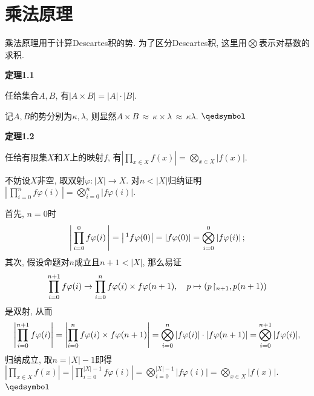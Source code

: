 \documentclass[UTF8]{ctexart}
\begin{document}
\setlength{\abovedisplayskip}{1pt}
\setlength{\belowdisplayskip}{1pt}

\section{乘法原理}

乘法原理用于计算Descartes积的势. 为了区分Descartes积,
这里用$\displaystyle\bigotimes$表示对基数的求积.

\vspace{10pt}

\hypertarget{sec:定理1.1}{}
\noindent\textbf{定理1.1}

任给集合$A,B$, 有$|A\times B|=|A|\cdot|B|$.


记$A,B$的势分别为$\kappa,\lambda$, 则显然$A\times B\,\approx\,
\kappa\times\lambda\,\approx\,\kappa\lambda$. \hfill $\qedsymbol$

\vspace{10pt}

\hypertarget{sec:定理1.2}{}
\noindent\textbf{定理1.2}

任给有限集$X$和$X$上的映射$f$, 有$\displaystyle
\left|\prod_{x\in X}f(x)\right|=\bigotimes_{x\in X}|f(x)|$.


不妨设$X$非空, 取双射$\varphi:|X|\to X$. 对$n<|X|$归纳证明$\displaystyle
\left|\,\prod_{i=0}^nf\varphi(i)\,\right|=\bigotimes_{i=0}^n|f\varphi(i)|$.

首先, $n=0$时
\[
    \left|\,\prod_{i=0}^0f\varphi(i)\,\right|=\left|\,^1f\varphi(0)\right|=
    |f\varphi(0)|=\bigotimes_{i=0}^0|f\varphi(i)|\,;\\[3pt]
\]
其次, 假设命题对$n$成立且$n+1<|X|$, 那么易证
\vspace{3pt}
\[
    \prod_{i=0}^{n+1}f\varphi(i)\to\prod_{i=0}^nf\varphi(i)\times f\varphi(n+1),
    \quad p\mapsto(p\!\restriction_{n+1},p(n+1))\\[3pt]
\]
是双射, 从而
\vspace{3pt}
\[
    \left|\prod_{i=0}^{n+1}f\varphi(i)\right|=
    \left|\prod_{i=0}^nf\varphi(i)\times f\varphi(n+1)\right|=
    \bigotimes_{i=0}^n|f\varphi(i)|\cdot|f\varphi(n+1)|=
    \bigotimes_{i=0}^{n+1}|f\varphi(i)|,\\[6pt]
\]
归纳成立, 取$n=|X|-1$即得$\displaystyle\left|\prod_{x\in X}f(x)\right|=
\left|\prod_{i=0}^{|X|-1}f\varphi(i)\right|=
\bigotimes_{i=0}^{|X|-1}|f\varphi(i)|=\bigotimes_{x\in X}|f(x)|$.
\hfill $\qedsymbol$

\vspace{13pt} %
\end{document}
